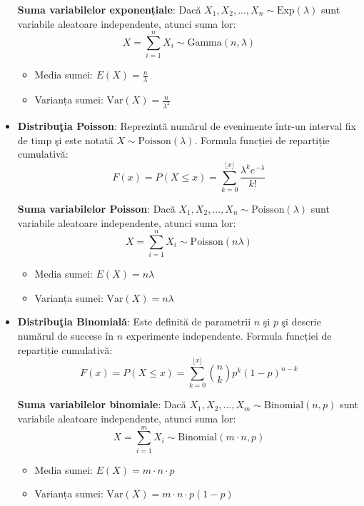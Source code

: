 \documentclass[a4paper,11pt]{article}
\begin{document}
\begin{itemize}
  \textbf{Suma variabilelor exponențiale}:  
  Dacă $X_1, X_2, ..., X_n \sim \text{Exp}(\lambda)$ sunt variabile aleatoare independente, atunci suma lor:
  \[
  X = \sum_{i=1}^{n} X_i \sim \text{Gamma}(n, \lambda)
  \]
  \begin{itemize}
    \item Media sumei: $E(X) = \frac{n}{\lambda}$
    \item Varianța sumei: $\text{Var}(X) = \frac{n}{\lambda^2}$
  \end{itemize}

  \item \textbf{Distribu\c{t}ia Poisson}: Reprezint\u{a} num\u{a}rul de evenimente într-un interval fix de timp \c{s}i este notat\u{a} $X \sim \text{Poisson}(\lambda)$.
  \newline
  Formula funcției de repartiție cumulativă:
  \[
  F(x) = P(X \leq x) = \sum_{k=0}^{\lfloor x \rfloor} \frac{\lambda^k e^{-\lambda}}{k!}
  \]

  \textbf{Suma variabilelor Poisson}:  
  Dacă $X_1, X_2, ..., X_n \sim \text{Poisson}(\lambda)$ sunt variabile aleatoare independente, atunci suma lor:
  \[
  X = \sum_{i=1}^{n} X_i \sim \text{Poisson}(n\lambda)
  \]
  \begin{itemize}
    \item Media sumei: $E(X) = n\lambda$
    \item Varianța sumei: $\text{Var}(X) = n\lambda$
  \end{itemize}

  \item \textbf{Distribu\c{t}ia Binomial\u{a}}: Este definit\u{a} de parametrii $n$ \c{s}i $p$ \c{s}i descrie num\u{a}rul de succese în $n$ experimente independente.
  \newline
  Formula funcției de repartiție cumulativă:
  \[
  F(x) = P(X \leq x) = \sum_{k=0}^{\lfloor x \rfloor} \binom{n}{k} p^k (1 - p)^{n - k}
  \]

  \textbf{Suma variabilelor binomiale}:  
  Dacă $X_1, X_2, ..., X_m \sim \text{Binomial}(n, p)$ sunt variabile aleatoare independente, atunci suma lor:
  \[
  X = \sum_{i=1}^{m} X_i \sim \text{Binomial}(m \cdot n, p)
  \]
  \begin{itemize}
    \item Media sumei: $E(X) = m \cdot n \cdot p$
    \item Varianța sumei: $\text{Var}(X) = m \cdot n \cdot p (1 - p)$
  \end{itemize}

\end{itemize}
\end{document}
